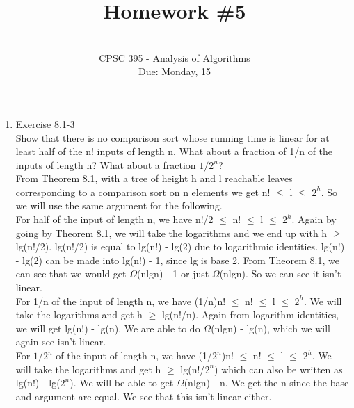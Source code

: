 \documentclass[12pt]{article}
\begin{document}
 
 
 
\title{Homework \#5}%
\author{\\ %
CPSC 395 - Analysis of Algorithms
\\ Due: Monday, 15} %
\date{}
\maketitle

\begin{enumerate}
\item Exercise 8.1-3 \\
Show that there is no comparison sort whose running time is linear for at least half of the n! inputs of length n. What about a fraction of 1/n of the inputs of length n? What about a fraction $1/2^n$? \\

From Theorem 8.1, with a tree of height h and l reachable leaves corresponding to a comparison sort on n elements we get n! $\leq$ l $\leq$ $2^h$. So we will use the same argument for the following. \\

For half of the input of length n, we have n!/2 $\leq$ n! $\leq$ l $\leq$ $2^h$. Again by going by Theorem 8.1, we will take the logarithms and we end up with h $\geq$ lg(n!/2). lg(n!/2) is equal to lg(n!) - lg(2) due to logarithmic identities. lg(n!) - lg(2) can be made into lg(n!) - 1, since lg is base 2. From Theorem 8.1, we can see that we would get $\Omega$(nlgn) - 1 or just $\Omega$(nlgn). So we can see it isn't linear.\\

For 1/n of the input of length n, we have (1/n)n! $\leq$ n! $\leq$ l $\leq$ $2^h$. We will take the logarithms and get h $\geq$ lg(n!/n). Again from logarithm identities, we will get lg(n!) - lg(n). We are able to do $\Omega$(nlgn) - lg(n), which we will again see isn't linear.\\

For $1/2^n$ of the input of length n, we have (1/$2^n$)n! $\leq$ n! $\leq$ l $\leq$ $2^h$. We will take the logarithms and get h $\geq$ lg(n!/$2^n$) which can also be written as lg(n!) - lg($2^n$). We will be able to get $\Omega$(nlgn) - n. We get the n since the base and argument are equal. We see that this isn't linear either. \\ 


\end{enumerate}
\end{document}
